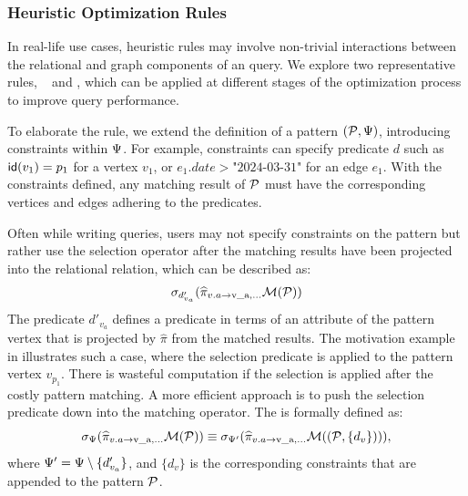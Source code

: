 \subsubsection{Heuristic Optimization Rules}
In real-life use cases, heuristic rules may involve non-trivial interactions between the relational and graph components of an \spjm query. We explore two representative rules, \filterrule~ and \joinfuserule, which can be applied at different stages of the optimization process to improve query performance.

 To elaborate the rule, we extend the definition of a pattern $(\mathcal{P}, \Psi)$, introducing constraints within $\Psi$. For example, constraints can specify predicate $d$ such as ${\mathsf{id}}(v_1) = p_1$ for a vertex $v_1$, or $e_1.date > \text{"2024-03-31"}$ for an edge $e_1$. With the constraints defined, any matching result of $\mathcal{P}$ must have the corresponding vertices and edges adhering to the predicates.

Often while writing queries, users may not specify constraints on the pattern but rather use the selection operator after the matching results have been projected into the relational relation, which can be described as:
\[
\sigma_{d'_{v_a}} (\widehat{\pi}_{v.a \rightarrow \text{v\_a}, \ldots} \mathcal{M}(\mathcal{P}))
\]
The predicate $d'_{v_a}$ defines a predicate in terms of an attribute of the pattern vertex that is projected by $\widehat{\pi}$ from the matched results. The motivation example in  illustrates such a case, where the selection predicate  is applied to the pattern vertex $v_{p_1}$.
There is wasteful computation if the selection is applied after the costly pattern matching. A more efficient approach is to push the selection predicate down into the matching operator.
The \filterrule is formally defined as:
\begin{equation*}
\sigma_{\Psi} (\widehat{\pi}_{v.a \rightarrow \text{v\_a}, \ldots} \mathcal{M}(\mathcal{P})) \\
\equiv \sigma_{\Psi'} (\widehat{\pi}_{v.a \rightarrow \text{v\_a}, \ldots} \mathcal{M}((\mathcal{P}, \{d_v\}))),
\end{equation*}
where $\Psi' = \Psi \setminus \{d'_{v_a}\}$, and $\{d_v\}$ is the corresponding constraints that are appended to the pattern $\mathcal{P}$.

